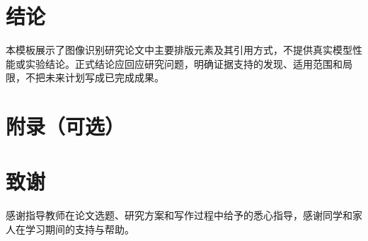 \documentclass[12pt,a4paper,fontset=none]{ctexart}
\newcommand{\song}{\CJKfamily{zhsong}}
\newcommand{\hei}{\CJKfamily{zhhei}}
\begin{document}
\newpage

\section{结论}
本模板展示了图像识别研究论文中主要排版元素及其引用方式，不提供真实模型性能或实验结论。正式结论应回应研究问题，明确证据支持的发现、适用范围和局限，不把未来计划写成已完成成果。

\par\vspace{3\baselineskip}
\begingroup
\renewcommand{\bibsection}{%
  \phantomsection
  \addcontentsline{toc}{section}{参考文献}%
  \noindent{\hei\zihao{-4}参考文献}\par
  \vspace{0.8em}%
}
\renewcommand{\bibfont}{\song\zihao{5}\linespread{1}\selectfont}


\endgroup

\clearpage
\section*{附录（可选）}


\newpage
\section*{致\quad 谢}

感谢指导教师在论文选题、研究方案和写作过程中给予的悉心指导，感谢同学和家人在学习期间的支持与帮助。
\end{document}
